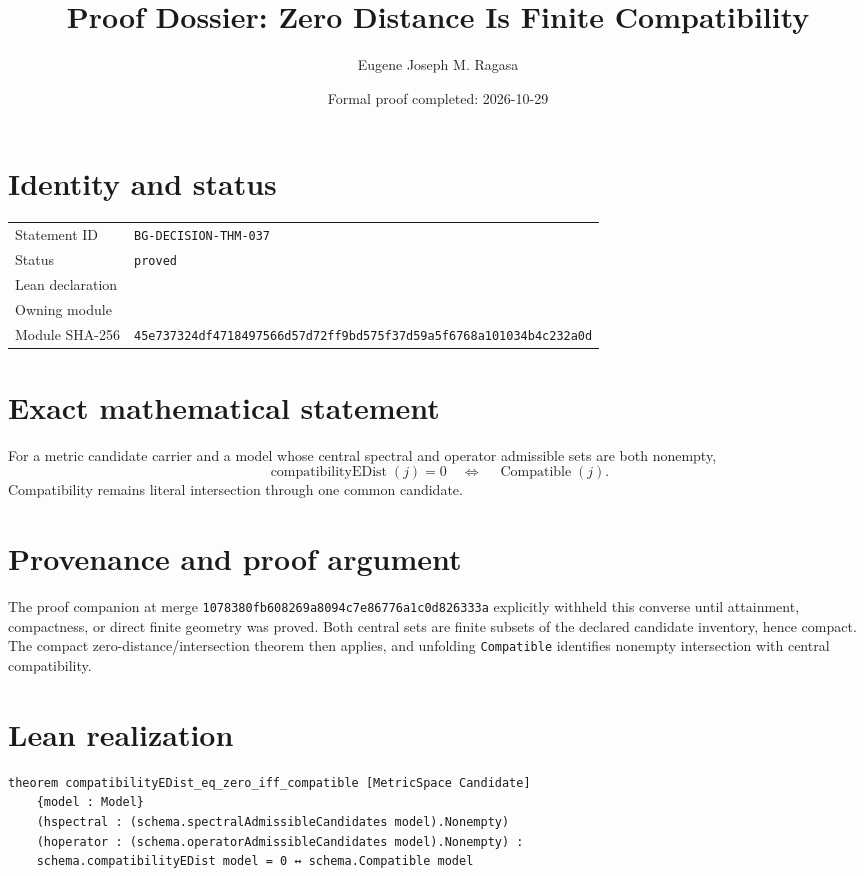 \documentclass[11pt]{article}
\title{Proof Dossier: Zero Distance Is Finite Compatibility}
\author{Eugene Joseph M. Ragasa}
\date{Formal proof completed: 2026-10-29}
\begin{document}
\maketitle
\section{Identity and status}
\begin{tabularx}{\textwidth}{@{}lY@{}}\toprule
Statement ID & \texttt{BG-DECISION-THM-037} \\
Status & \texttt{proved} \\
Lean declaration &  \\
Owning module &  \\
Module SHA-256 & \texttt{45e737324df4718497566d57d72ff9bd575f37d59a5f6768a101034b4c232a0d} \\
\bottomrule\end{tabularx}
\section{Exact mathematical statement}
For a metric candidate carrier and a model whose central spectral and operator admissible
sets are both nonempty,
\[
  \operatorname{compatibilityEDist}(j)=0
  \quad\Longleftrightarrow\quad
  \operatorname{Compatible}(j).
\]
Compatibility remains literal intersection through one common candidate.
\section{Provenance and proof argument}
The proof companion at merge
\texttt{1078380fb608269a8094c7e86776a1c0d826333a} explicitly withheld this converse until
attainment, compactness, or direct finite geometry was proved. Both central sets are
finite subsets of the declared candidate inventory, hence compact. The compact
zero-distance/intersection theorem then applies, and unfolding \texttt{Compatible}
identifies nonempty intersection with central compatibility.
\section{Lean realization}
\begin{lstlisting}
theorem compatibilityEDist_eq_zero_iff_compatible [MetricSpace Candidate]
    {model : Model}
    (hspectral : (schema.spectralAdmissibleCandidates model).Nonempty)
    (hoperator : (schema.operatorAdmissibleCandidates model).Nonempty) :
    schema.compatibilityEDist model = 0 ↔ schema.Compatible model
\end{lstlisting}
\end{document}
